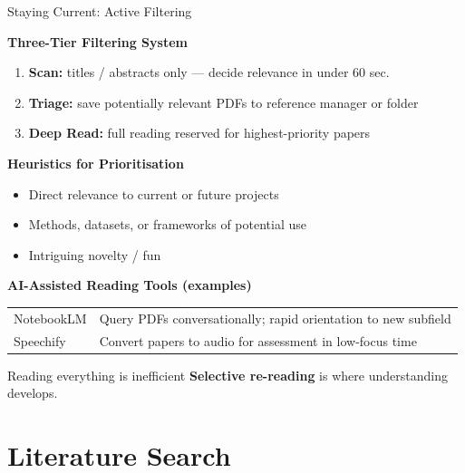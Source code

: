 \documentclass{beamer}
\begin{document}
\begin{frame}{Staying Current: Active Filtering}

  \footnotesize
  \textbf{Three-Tier Filtering System}
  \smallskip
  \begin{enumerate}
    \item \textbf{Scan:} titles / abstracts only ---
      decide relevance in under 60 sec.
    \item \textbf{Triage:} save potentially relevant PDFs
      to reference manager or folder
    \item \textbf{Deep Read:} full reading reserved for
      highest-priority papers
  \end{enumerate}

  \medskip
  \textbf{Heuristics for Prioritisation}
  \begin{itemize}
    \item Direct relevance to current or future projects
    \item Methods, datasets, or frameworks of potential use
    \item Intriguing novelty / fun
  \end{itemize}

  \medskip
  \textbf{AI-Assisted Reading Tools (examples)}

  \smallskip
  \begin{tabular}{@{}lp{7.5cm}@{}}
    \hline
    NotebookLM  & Query PDFs conversationally;
                           rapid orientation to new subfield \\
    Speechify   & Convert papers to audio for
                           assessment in low-focus time \\
    \hline
  \end{tabular}

  \vfill
  \begin{block}{Reading everything is inefficient}
    \textbf{Selective re-reading} is where understanding develops.
  \end{block}

\end{frame}


\section{Literature Search}
\end{document}
